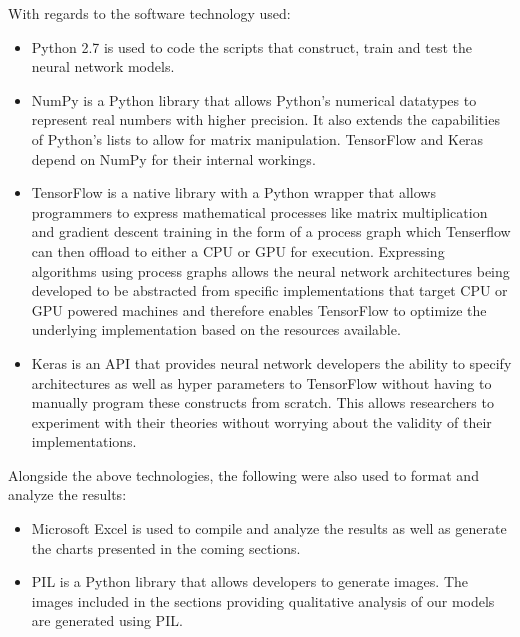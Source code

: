 With regards to the software technology used:
\begin{itemize}
	\item Python 2.7 is used to code the scripts that construct, train and test the neural network models.
	\item NumPy is a Python library that allows Python's numerical datatypes to represent real numbers with higher precision. It also extends the capabilities of Python's lists to allow for matrix manipulation. TensorFlow and Keras depend on NumPy for their internal workings.
	\item TensorFlow is a native library with a Python wrapper that allows programmers to express mathematical processes like matrix multiplication and gradient descent training in the form of a process graph which Tenserflow can then offload to either a CPU or GPU for execution. Expressing algorithms using process graphs allows the neural network architectures being developed to be abstracted from specific implementations that target CPU or GPU powered machines and therefore enables TensorFlow to optimize the underlying implementation based on the resources available.
	\item Keras is an API that provides neural network developers the ability to specify architectures as well as hyper parameters to TensorFlow without having to manually program these constructs from scratch. This allows researchers to experiment with their theories without worrying about the validity of their implementations.
\end{itemize}	

Alongside the above technologies, the following were also used to format and analyze the results:
\begin{itemize}
	\item Microsoft Excel is used to compile and analyze the results as well as generate the charts presented in the coming sections.
	\item PIL is a Python library that allows developers to generate images. The images included in the sections providing qualitative analysis of our models are generated using PIL.
\end{itemize}